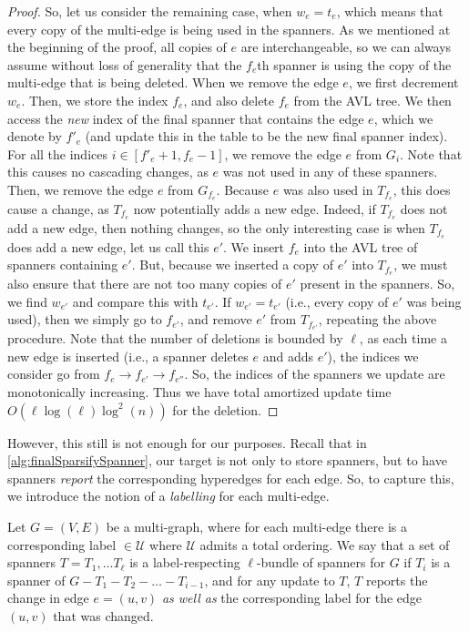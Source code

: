 \documentclass{article}
\begin{document}
\begin{proof}
    So, let us consider the remaining case, when $w_e = t_e$, which means that every copy of the multi-edge is being used in the spanners.
As we mentioned at the beginning of the proof, all copies of $e$ are interchangeable, so we can always assume without loss of generality that the $f_e$th spanner is using the copy of the multi-edge that is being deleted.
    When we remove the edge $e$, we first decrement $w_e$. Then, we store the index $f_e$, and also delete $f_e$ from the AVL tree. We then access the \emph{new} index of the final spanner that contains the edge $e$, which we denote by $f'_e$ (and update this in the table to be the new final spanner index). For all the indices $i \in [f'_e + 1, f_e - 1]$, we remove the edge $e$ from $G_i$. Note that this causes no cascading changes, as $e$ was not used in any of these spanners. Then, we remove the edge $e$ from $G_{f_e}$. Because $e$ was also used in $T_{f_e}$, this does cause a change, as $T_{f_e}$ now potentially adds a new edge. Indeed, if $T_{f_e}$ does not add a new edge, then nothing changes, so the only interesting case is when $T_{f_e}$ does add a new edge, let us call this $e'$. We insert $f_e$ into the AVL tree of spanners containing $e'$. But, because we inserted a copy of $e'$ into $T_{f_e}$, we must also ensure that there are not too many copies of $e'$ present in the spanners. So, we find $w_{e'}$ and compare this with $t_{e'}$. If $w_{e'} = t_{e'}$ (i.e., every copy of $e'$ was being used), then we simply go to $f_{e'}$, and remove $e'$ from $T_{f_{e'}}$, repeating the above procedure. Note that the number of deletions is bounded by $\ell$, as each time a new edge is inserted (i.e., a spanner deletes $e$ and adds $e'$), the indices we consider go from $f_e \rightarrow f_{e'} \rightarrow f_{e''}$. So, the indices of the spanners we update are monotonically increasing.
    Thus we have total amortized update time $O(\ell \log(\ell) \log^2(n))$ for the deletion.
\end{proof}

However, this still is not enough for our purposes. Recall that in \cref{alg:finalSparsifySpanner}, our target is not only to store spanners, but to have spanners \emph{report} the corresponding hyperedges for each edge. So, to capture this, we introduce the notion of a \emph{labelling} for each multi-edge. 

\begin{definition}
    Let $G = (V, E)$ be a multi-graph, where for each multi-edge there is a corresponding label $\in \mathcal{U}$ where $\mathcal{U}$ admits a total ordering. We say that a set of spanners $T = T_1, \dots T_{\ell}$ is a label-respecting $\ell$-bundle of spanners for $G$ if $T_i$ is a spanner of $G - T_1 - T_2 - \dots - T_{i-1}$, and for any update to $T$, $T$ reports the change in edge $e = (u,v)$ \emph{as well as} the corresponding label for the edge $(u,v)$ that was changed.
\end{definition}
\end{document}
